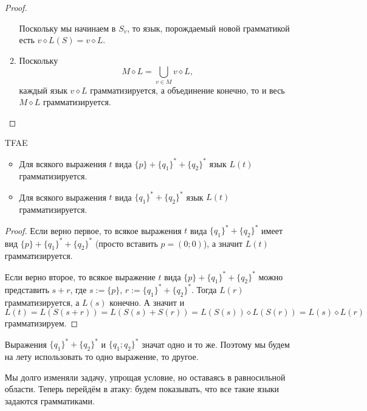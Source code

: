 \documentclass[12pt,a4paper]{article}
\begin{document}
\begin{problem}{8}
\begin{enumerate}
\begin{proof}
\begin{enumerate}
                            Поскольку мы начинаем в $S_v$, то язык, порождаемый новой грамматикой есть $v \diamond L(S) = v \diamond L$.
                        \item Поскольку
                            \[M \diamond L = \bigcup_{v \in M} v \diamond L,\]
                            каждый язык $v \diamond L$ грамматизируется, а объединение конечно, то и весь $M \diamond L$ грамматизируется.
                    \end{enumerate}
                \end{proof}

                \begin{corollary}
                    TFAE
                    \begin{itemize}
                        \item Для всякого выражения $t$ вида $\{p\} + \{q_1\}^* + \{q_2\}^*$ язык $L(t)$ грамматизируется.
                        \item Для всякого выражения $t$ вида $\{q_1\}^* + \{q_2\}^*$ язык $L(t)$ грамматизируется.
                    \end{itemize}
                \end{corollary}

                \begin{proof}
                    Если верно первое, то всякое выражения $t$ вида $\{q_1\}^* + \{q_2\}^*$ имеет вид $\{p\} + \{q_1\}^* + \{q_2\}^*$ (просто вставить $p = (0; 0)$), а значит $L(t)$ грамматизируется.

                    Если верно второе, то всякое выражение $t$ вида $\{p\} + \{q_1\}^* + \{q_2\}^*$ можно представить $s + r$, где $s := \{p\}$, $r := \{q_1\}^* + \{q_2\}^*$. Тогда $L(r)$ грамматизируется, а $L(s)$ конечно. А значит и
                    \[L(t) = L(S(s + r)) = L(S(s) + S(r)) = L(S(s)) \diamond L(S(r)) = L(s) \diamond L(r)\]
                    грамматизируем.
                \end{proof}

                \begin{remark*}
                    Выражения $\{q_1\}^* + \{q_2\}^*$ и $\{q_1; q_2\}^*$ значат одно и то же. Поэтому мы будем на лету использовать то одно выражение, то другое.
                \end{remark*}

                Мы долго изменяли задачу, упрощая условие, но оставаясь в равносильной области. Теперь перейдём в атаку: будем показывать, что все такие языки задаются грамматиками.


\end{enumerate}
\end{problem}
\end{document}
